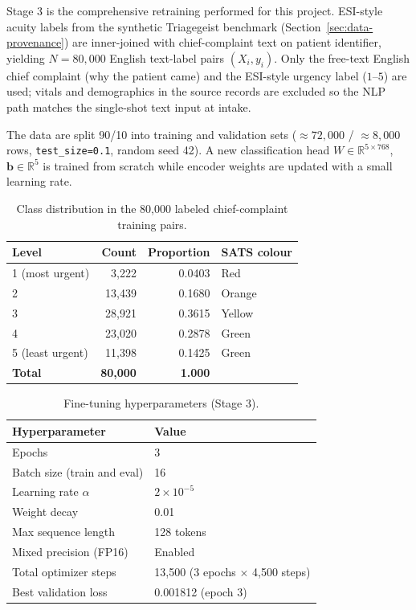 Stage 3 is the comprehensive retraining performed for this project. ESI-style acuity labels from the synthetic Triagegeist benchmark (Section~\ref{sec:data-provenance}) are inner-joined with chief-complaint text on patient identifier, yielding \(N = 80{,}000\) English text-label pairs \((X_i, y_i)\). Only the free-text English chief complaint (why the patient came) and the ESI-style urgency label (\(1\)--\(5\)) are used; vitals and demographics in the source records are excluded so the NLP path matches the single-shot text input at intake.

The data are split 90/10 into training and validation sets (\(\approx 72{,}000\) / \(\approx 8{,}000\) rows, \texttt{test\_size=0.1}, random seed 42). A new classification head \(W \in \mathbb{R}^{5 \times 768}\), \(\mathbf{b} \in \mathbb{R}^{5}\) is trained from scratch while encoder weights are updated with a small learning rate.

\begin{table}[H]
\centering
\small
\begin{tabular}{|l|r|r|l|}
\hline
\textbf{Level} & \textbf{Count} & \textbf{Proportion} & \textbf{SATS colour} \\
\hline
1 (most urgent) & 3,222 & 0.0403 & Red \\
2 & 13,439 & 0.1680 & Orange \\
3 & 28,921 & 0.3615 & Yellow \\
4 & 23,020 & 0.2878 & Green \\
5 (least urgent) & 11,398 & 0.1425 & Green \\
\hline
\textbf{Total} & \textbf{80,000} & \textbf{1.000} & \\
\hline
\end{tabular}
\caption{Class distribution in the 80{,}000 labeled chief-complaint training pairs.}
\label{tab:class-distribution}
\end{table}

\begin{table}[H]
\centering
\small
\begin{tabular}{|l|l|}
\hline
\textbf{Hyperparameter} & \textbf{Value} \\
\hline
Epochs & 3 \\
Batch size (train and eval) & 16 \\
Learning rate \(\alpha\) & \(2 \times 10^{-5}\) \\
Weight decay & 0.01 \\
Max sequence length & 128 tokens \\
Mixed precision (FP16) & Enabled \\
Total optimizer steps & 13,500 (3 epochs \(\times\) 4,500 steps) \\
Best validation loss & 0.001812 (epoch 3) \\
\hline
\end{tabular}
\caption{Fine-tuning hyperparameters (Stage 3).}
\label{tab:hyperparams}
\end{table}


